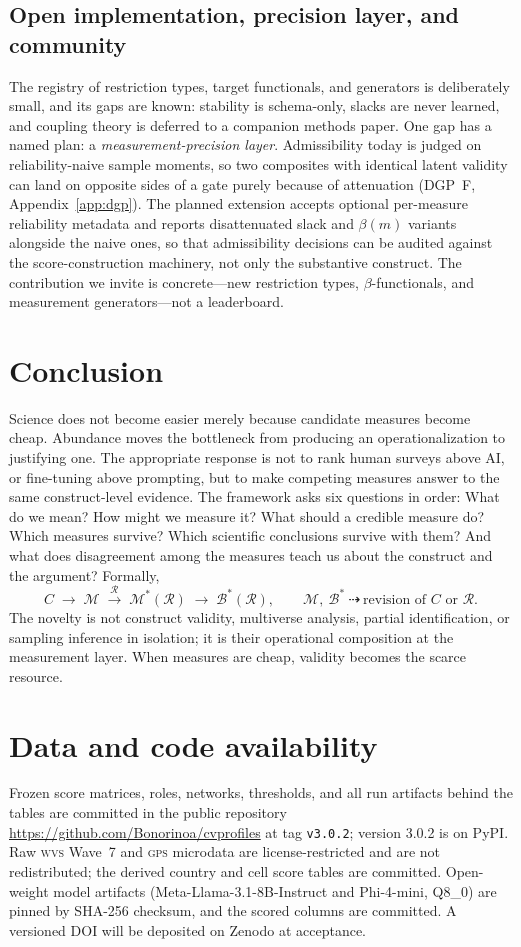 \documentclass[10pt,letterpaper]{article}
\newcommand{\GPS}{\textsc{gps}}
\newcommand{\WVS}{\textsc{wvs}}
\newcommand{\M}{\ensuremath{\mathcal{M}}}
\newcommand{\Rset}{\mathcal{R}}
\newcommand{\Bset}{\mathcal{B}}
\begin{document}
\subsection{Open implementation, precision layer, and community}
\label{sec:community}
The registry of restriction types, target functionals, and generators is deliberately small, and its gaps are known: stability is schema-only, slacks are never learned, and coupling theory is deferred to a companion methods paper.
One gap has a named plan: a \emph{measurement-precision layer}.
Admissibility today is judged on reliability-naive sample moments, so two composites with identical latent validity can land on opposite sides of a gate purely because of attenuation (DGP~F, Appendix~\ref{app:dgp}).
The planned extension accepts optional per-measure reliability metadata and reports disattenuated slack and $\beta(m)$ variants alongside the naive ones, so that admissibility decisions can be audited against the score-construction machinery, not only the substantive construct.
The contribution we invite is concrete---new restriction types, $\beta$-functionals, and measurement generators---not a leaderboard.

\section{Conclusion}
\label{sec:conclusion}

Science does not become easier merely because candidate measures become cheap.
Abundance moves the bottleneck from producing an operationalization to justifying one.
The appropriate response is not to rank human surveys above AI, or fine-tuning above prompting, but to make competing measures answer to the same construct-level evidence.
The framework asks six questions in order: What do we mean?
How might we measure it?
What should a credible measure do?
Which measures survive?
Which scientific conclusions survive with them?
And what does disagreement among the measures teach us about the construct and the argument?
Formally,
\[
C\;\longrightarrow\;\M\;\xrightarrow{\;\Rset\;}\;\M^*(\Rset)\;\longrightarrow\;\Bset^*(\Rset),
\qquad
\M,\ \Bset^*\ \dashrightarrow\ \text{revision of } C \text{ or } \Rset.
\]
The novelty is not construct validity, multiverse analysis, partial identification, or sampling inference in isolation; it is their operational composition at the measurement layer.
When measures are cheap, validity becomes the scarce resource.

\section*{Data and code availability}
Frozen score matrices, roles, networks, thresholds, and all run artifacts behind the tables are committed in the public repository \url{https://github.com/Bonorinoa/cvprofiles} at tag \texttt{v3.0.2}; version 3.0.2 is on PyPI.
Raw \WVS{} Wave~7 and \GPS{} microdata are license-restricted and are not redistributed; the derived country and cell score tables are committed.
Open-weight model artifacts (Meta-Llama-3.1-8B-Instruct and Phi-4-mini, Q8\_0) are pinned by SHA-256 checksum, and the scored columns are committed.
A versioned DOI will be deposited on Zenodo at acceptance.
\end{document}
